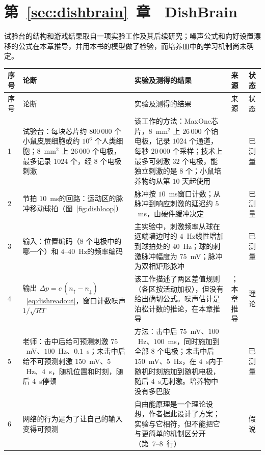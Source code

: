 \section{第~\ref{sec:dishbrain}~章　DishBrain}

试验台的结构和游戏结果取自一项实验工作及其后续研究；噪声公式和向好设置漂移的公式在本章推导，并用本书的模型做了检验，而培养皿中的学习机制尚未确定。

{\footnotesize
\setlength{\tabcolsep}{3pt}\renewcommand{\arraystretch}{1.15}
\begin{longtable}{>{\raggedright}p{0.5cm}>{\raggedright}p{4.0cm}>{\raggedright}p{5.6cm}>{\raggedright}p{2.3cm}>{\raggedright\arraybackslash}p{1.7cm}}
\toprule
序号 & 论断 & 实验及测得的结果 & 来源 & 状态 \\
\midrule\endfirsthead
\toprule
序号 & 论断 & 实验及测得的结果 & 来源 & 状态 \\
\midrule\endhead
1 & 试验台：每块芯片约 $800\,000$ 个小鼠皮层细胞或约 $10^6$ 个人类细胞；$8$~mm$^2$ 上 $26\,000$ 个电极，最多记录 $1024$ 个，经 $8$ 个电极刺激 & 该工作的方法：MaxOne芯片，$8$~mm$^2$ 上 $26\,000$ 个铂电极，记录 $1024$ 个通道，每秒 $20\,000$ 个采样；技术上最多可刺激 $32$ 个电极，能独立刺激的是 $8$ 个；小鼠培养物约从第 $10$ 天起使用 & \cite{Kagan2022} & 已测量 \\
2 & 节拍 $10$~ms的回路：运动区的脉冲移动球拍（图~\ref{fig:dishloop}） & 脉冲按 $10$~ms窗口计数；从脉冲到响应刺激的延迟约 $5$~ms，由硬件缓冲决定 & \cite{Kagan2022} & 已测量 \\
3 & 输入：位置编码（$8$ 个电极中的哪一个）和 $4$--$40$~Hz的频率编码 & 主实验中，刺激频率从球在远端墙边时的 $4$~Hz线性增加到球拍处的 $40$~Hz；球的刺激脉冲幅度为 $75$~mV；脉冲为双相矩形脉冲 & \cite{Kagan2022} & 已测量 \\
4 & 输出 $\Delta p=c\,(n_\uparrow-n_\downarrow)$~\eqref{eq:dishreadout}，窗口计数噪声 $1/\sqrt{RT}$ & 该工作描述了两区差值规则（各区按活动加权），但没有给出确切公式。噪声估计是泊松计数的推论，在本章推导 & \cite{Kagan2022}；本章推导 & 理论 \\
5 & 老师：击中后给可预测刺激 $75$~mV、$100$~Hz、$0.1$~s；未击中后给不可预测刺激 $150$~mV、$5$~Hz、$4$~s，随机位置和时刻，随后 $4$~s停顿 & 方法：击中后 $75$~mV、$100$~Hz、$100$~ms，同时施加到全部 $8$ 个电极；未击中后 $150$~mV、$5$~Hz，在 $4$~s内于随机时刻施加到随机电极，随后 $4$~s无刺激。培养物中没有多巴胺 & \cite{Kagan2022} & 已测量 \\
6 & 网络的行为是为了让自己的输入变得可预测 & 自由能原理是一个理论设想，作者据此设计了方案；实验与它相符，但不能把它与更简单的机制区分开（第~7--8~行） & \cite{Friston2010,Kagan2022} & 假说 \\

\end{longtable}}
